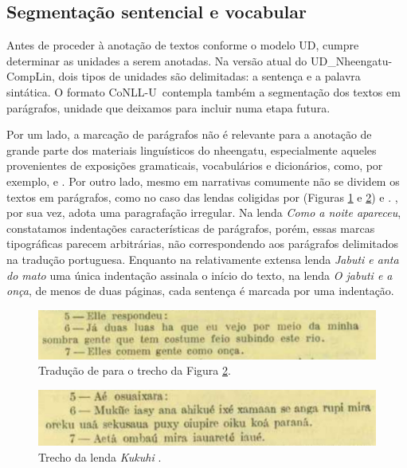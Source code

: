 \documentclass[portuguese]{textolivre}
\newcommand{\tbc}{UD\_Nheengatu-CompLin}
\newcommand{\conll}{CoNLL-U}
\begin{document}
\subsection{Segmentação sentencial e vocabular}\label{subsec:segmentacao}

Antes de proceder à anotação de textos conforme o modelo UD, cumpre determinar as unidades a serem anotadas. Na versão atual do \tbc, dois tipos de unidades são delimitadas: a sentença e a palavra sintática. O formato \conll~contempla também a segmentação dos textos em parágrafos, unidade que deixamos para incluir numa etapa futura. 

Por um lado, a marcação de parágrafos não é relevante para a anotação de grande parte dos materiais linguísticos do nheengatu, especialmente aqueles provenientes de exposições gramaticais, vocabulários e dicionários, como, por exemplo, \textcite{sympson1877} e \textcite{cruz2011}. Por outro lado, mesmo em narrativas comumente não se dividem os textos em parágrafos, como no caso das lendas coligidas por \textcite{Amorim1928} (Figuras \ref{fig:kukuhy-por} e \ref{fig:kukuhy-yrl}) e \textcite{casasnovas2006}. \textcite{magalhaes1876}, por sua vez, adota uma paragrafação irregular. Na lenda \textit{Como a noite apareceu}, constatamos indentações características de parágrafos, porém, essas marcas tipográficas parecem arbitrárias, não correspondendo aos parágrafos delimitados na tradução portuguesa. Enquanto na relativamente extensa lenda \textit{Jabuti e anta do mato} uma única indentação assinala o início do texto, na lenda \textit{O jabuti e a onça}, de menos de duas páginas, cada sentença é marcada por uma indentação.

\begin{figure}[htbp]
  \centering
  \begin{minipage}{.7\textwidth}
    \includegraphics[width=\linewidth]{figures/Amorim-p301-por.pdf}
    \caption{Tradução de \textcite[p. 301]{Amorim1928} para o trecho da Figura \ref{fig:kukuhy-yrl}.}
    \label{fig:kukuhy-por}
  \end{minipage}
\end{figure}

\begin{figure}[htbp]
  \centering
  \begin{minipage}{.7\textwidth}
    \includegraphics[width=\linewidth]{figures/Amorim-p309-yrl.pdf}
    \caption{Trecho da lenda \textit{Kukuhi} \parencite[p. 309]{Amorim1928}.}
    \label{fig:kukuhy-yrl}
  \end{minipage}
\end{figure}
\end{document}
